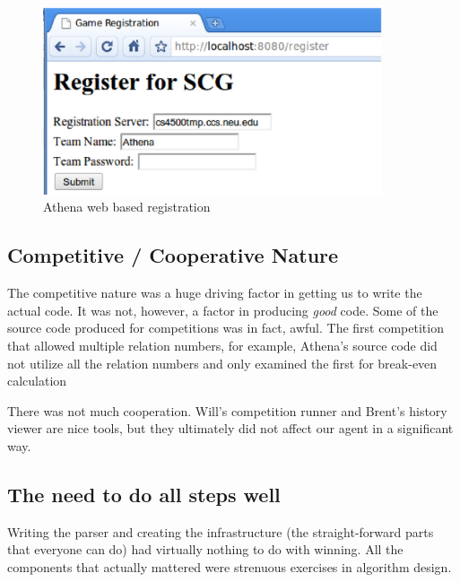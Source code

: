 \documentclass[letterpaper,12pt,oneside]{article}
\begin{document}
\begin{figure}[htp]
\centering
\includegraphics[width=100mm]{registration.eps}
\caption{Athena web based registration}
\label{fig:registration}
\end{figure}

\subsection{Competitive / Cooperative Nature}

The competitive nature was a huge driving factor in getting us to write
the actual code. It was not, however, a factor in producing {\em good}
code. Some of the source code produced for competitions was in fact, awful. The
first competition that allowed multiple relation numbers, for example, Athena's
source code did not utilize all the relation numbers and only examined the first for break-even calculation

There was not much cooperation. Will's competition runner and Brent's
history viewer are nice tools, but they ultimately did not affect our
agent in a significant way.

\subsection{The need to do all steps well}

Writing the parser and creating the infrastructure (the straight-forward
parts that everyone can do) had virtually nothing to do with winning. All
the components that actually mattered were strenuous exercises in algorithm
design.
\end{document}
